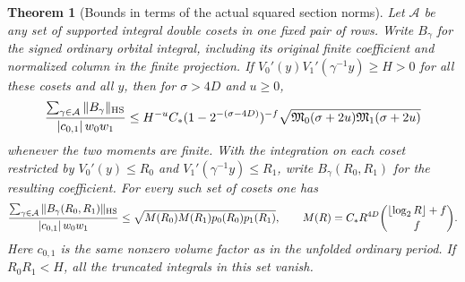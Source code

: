 \documentclass[a4paper,11pt]{article}
\newtheorem{theorem}[proposition]{Theorem}
\theoremstyle{definition}
\theoremstyle{remark}
\numberwithin{equation}{section}
\begin{document}
\begin{theorem}[Bounds in terms of the actual squared section norms]
\leavevmode\label{thm:twoenergies592}
Let \(\mathcal A\) be any set of supported integral double
cosets in one fixed pair of rows. Write \(B_\gamma\) for the
signed ordinary orbital integral, including its original finite
coefficient and normalized column in the finite projection.
If \(V_0'(y)V_1'(\gamma^{-1}y)\ge H>0\) for all these
cosets and all \(y\), then for \(\sigma>4D\) and \(u\ge0\),
\[
 \frac{\sum_{\gamma\in\mathcal A}\|B_\gamma\|_{\rm HS}}
      {|c_{0,1}|\,w_0w_1}
 \le H^{-u}C_*(1-2^{-(\sigma-4D)})^{-f}
       \sqrt{\mathfrak M_0(\sigma+2u)\mathfrak M_1(\sigma+2u)}
\]
whenever the two moments are finite.
With the integration on each coset restricted by
\(V_0'(y)\le R_0\) and \(V_1'(\gamma^{-1}y)\le R_1\), write
\(B_\gamma(R_0,R_1)\) for the resulting coefficient. For
every such set of cosets one has
\[
 \frac{\sum_{\gamma\in\mathcal A}
                    \|B_\gamma(R_0,R_1)\|_{\rm HS}}
      {|c_{0,1}|\,w_0w_1}
 \le\sqrt{M(R_0)M(R_1)p_0(R_0)p_1(R_1)},\qquad
 M(R)=C_* R^{4D}\binom{\lfloor\log_2 R\rfloor+f}{f}.
\]
Here \(c_{0,1}\) is the same nonzero volume factor as in the
unfolded ordinary period. If \(R_0R_1<H\), all the truncated
integrals in this set vanish.
\end{theorem}
\end{document}
